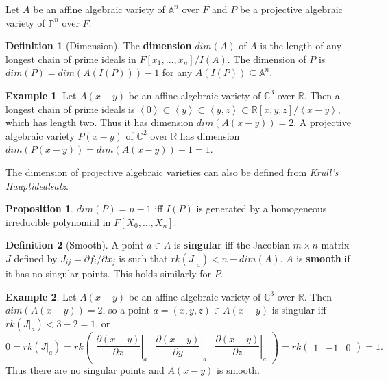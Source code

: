 \documentclass{article}
\newcommand{\R}{\mathbb{R}}
\newcommand{\C}{\mathbb{C}}
\newcommand{\A}{\mathbb{A}}
\renewcommand{\P}{\mathbb{P}}
\newcommand{\val}[1]{\left. #1 \right\rvert}
\newcommand{\rb}[1]{\left( #1 \right)}
\renewcommand{\sb}[1]{\left[ #1 \right]}
\newcommand{\ab}[1]{\left\langle #1 \right\rangle}
\theoremstyle{definition}\newtheorem*{definition}{Definition}
\theoremstyle{definition}\newtheorem*{example}{Example}
\theoremstyle{definition}\newtheorem*{remark}{Remark}
\newtheorem{proposition}{Proposition}[subsection]
\begin{document}
Let $ A $ be an affine algebraic variety of $ \A^n $ over $ F $ and $ P $ be a projective algebraic variety of $ \P^n $ over $ F $.

\begin{definition}[Dimension]
The \textbf{dimension} $ dim\rb{A} $ of $ A $ is the length of any longest chain of prime ideals in $ F\sb{x_1, \dots, x_n} / I\rb{A} $. The dimension of $ P $ is $ dim\rb{P} = dim\rb{A\rb{I\rb{P}}} - 1 $ for any $ A\rb{I\rb{P}} \subseteq \A^n $.
\end{definition}

\begin{example}
Let $ A\rb{x - y} $ be an affine algebraic variety of $ \C^3 $ over $ \R $. Then a longest chain of prime ideals is $ \ab{0} \subset \ab{y} \subset \ab{y, z} \subset \R\sb{x, y, z} / \ab{x - y} $, which has length two. Thus it has dimension $ dim\rb{A\rb{x - y}} = 2 $. A projective algebraic variety $ P\rb{x - y} $ of $ \C^2 $ over $ \R $ has dimension $ dim\rb{P\rb{x - y}} = dim\rb{A\rb{x - y}} - 1 = 1 $.
\end{example}

The dimension of projective algebraic varieties can also be defined from \emph{Krull's Hauptidealsatz}.

\begin{proposition}
$ dim\rb{P} = n - 1 $ iff $ I\rb{P} $ is generated by a homogeneous irreducible polynomial in $ F\sb{X_0, \dots, X_n} $.
\end{proposition}

\begin{definition}[Smooth]
A point $ a \in A $ is \textbf{singular} iff the Jacobian $ m \times n $ matrix $ J $ defined by $ J_{ij} = \partial f_i / \partial x_j $ is such that $ rk\rb{\val{J}_a} < n - dim\rb{A} $. $ A $ is \textbf{smooth} if it has no singular points. This holds similarly for $ P $.
\end{definition}

\begin{example}
Let $ A\rb{x - y} $ be an affine algebraic variety of $ \C^3 $ over $ \R $. Then $ dim\rb{A\rb{x - y}} = 2 $, so a point $ a = \rb{x, y, z} \in A\rb{x - y} $ is singular iff $ rk\rb{\val{J}_a} < 3 - 2 = 1 $, or
$$ 0 = rk\rb{\val{J}_a} = rk \begin{pmatrix} \val{\dfrac{\partial \rb{x - y}}{\partial x}}_a & \val{\dfrac{\partial \rb{x - y}}{\partial y}}_a & \val{\dfrac{\partial \rb{x - y}}{\partial z}}_a \end{pmatrix} = rk \begin{pmatrix} 1 & -1 & 0 \end{pmatrix} = 1. $$
Thus there are no singular points and $ A\rb{x - y} $ is smooth.
\end{example}
\end{document}

